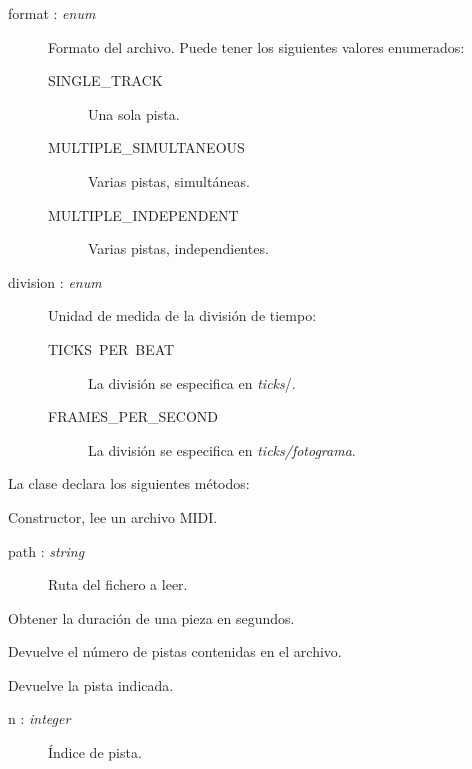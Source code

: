 \begin{description}
	\item[format : \textit{enum}] Formato del archivo. Puede tener los siguientes valores enumerados:
	
	\begin{description}
		\item[SINGLE\_TRACK] Una sola pista.
		\item[MULTIPLE\_SIMULTANEOUS] Varias pistas, simultáneas.
		\item[MULTIPLE\_INDEPENDENT] Varias pistas, independientes.
	\end{description}
	
	\item[division : \textit{enum}] Unidad de medida de la división de tiempo:
	
	\begin{description}
		\item[TICKS\ PER\ BEAT] La división se especifica en \textit{ticks}/\quarternote.
		\item[FRAMES\_PER\_SECOND] La división se especifica en \textit{ticks/fotograma}.
	\end{description}

\end{description}

La clase declara los siguientes métodos:

\begin{description}[style=nextline]
	\item[MidiFile (path)] 
	Constructor, lee un archivo \acrshort{MIDI}. 
	
	\begin{description}
		\item[path : \textit{string}] Ruta del fichero a leer.
	\end{description}
	
	\item[duration () : \textit{float}] 
	Obtener la duración de una pieza en segundos.
	
	\item[length : \textit{integer}]
	Devuelve el número de pistas contenidas en el archivo.
	
	\item[get (n) : \textit{MidiFile}]
	Devuelve la pista indicada.
	
	\begin{description}
		\item[n : \textit{integer}] Índice de pista.
	\end{description}
\end{description}

